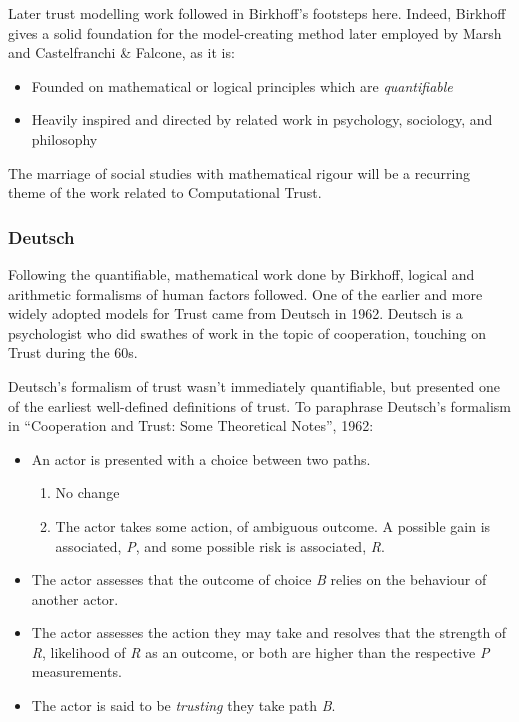 Later trust modelling work followed in Birkhoff's footsteps here. Indeed, Birkhoff gives a solid foundation for the model-creating method later employed by Marsh\cite{Marsh1994FormalisingConcept} and Castelfranchi \& Falcone, as it is:
\begin{itemize}
    \item Founded on mathematical or logical principles which are \emph{quantifiable}
    \item Heavily inspired and directed by related work in psychology, sociology, and philosophy
\end{itemize}\par

The marriage of social studies with mathematical rigour will be a recurring theme of the work related to Computational Trust.\par

\subsubsection{Deutsch}
Following the quantifiable, mathematical work done by Birkhoff, logical and arithmetic formalisms of human factors followed. One of the earlier and more widely adopted models for Trust came from Deutsch in 1962. 
Deutsch is a psychologist who did swathes of work in the topic of cooperation, touching on Trust during the 60s. \par

Deutsch's formalism of trust wasn't immediately quantifiable, but presented one of the earliest well-defined definitions of trust. To paraphrase Deutsch's formalism in ``Cooperation and Trust: Some Theoretical Notes'', 1962:
\begin{itemize}
    \item An actor is presented with a choice between two paths.
    \begin{enumerate}[label=\emph{\Alph*}:]
        \item No change
        \item The actor takes some action, of ambiguous outcome. A possible gain is associated, \emph{P}, and some possible risk is associated, \emph{R}.
    \end{enumerate}
    \item The actor assesses that the outcome of choice \emph{B} relies on the behaviour of another actor.
    \item The actor assesses the action they may take and resolves that the strength of \emph{R}, likelihood of \emph{R} as an outcome, or both are higher than the respective \emph{P} measurements.
    \item The actor is said to be \emph{trusting} they take path \emph{B}.
\end{itemize}

